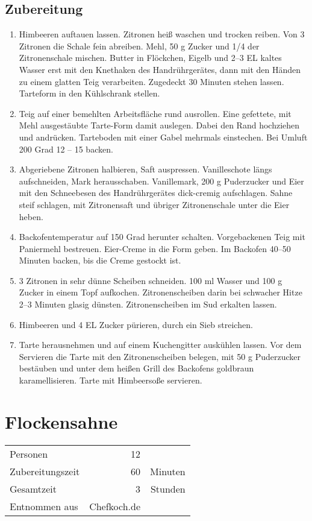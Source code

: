 \subsection*{Zubereitung}
\begin{enumerate}
	\item Himbeeren auftauen lassen. Zitronen heiß waschen und trocken reiben. Von 3 Zitronen die Schale fein abreiben. Mehl, 50 g Zucker und 1/4 der Zitronenschale mischen. Butter in Flöckchen, Eigelb und 2–3 EL kaltes Wasser erst mit den Knethaken des Handrührgerätes, dann mit den Händen zu einem glatten Teig verarbeiten. Zugedeckt 30 Minuten stehen lassen. Tarteform in den Kühlschrank stellen.
	\item Teig auf einer bemehlten Arbeitsfläche rund ausrollen. Eine gefettete, mit Mehl ausgestäubte Tarte-Form damit auslegen. Dabei den Rand hochziehen und andrücken. Tarteboden mit einer Gabel mehrmals einstechen. Bei Umluft 200 Grad 12 -- 15 backen. 
	\item Abgeriebene Zitronen halbieren, Saft auspressen. Vanilleschote längs aufschneiden, Mark herausschaben. Vanillemark, 200 g Puderzucker und Eier mit den Schneebesen des Handrührgerätes dick-cremig aufschlagen. Sahne steif schlagen, mit Zitronensaft und übriger Zitronenschale unter die Eier heben.
	\item Backofentemperatur auf 150 Grad herunter schalten. Vorgebackenen Teig mit Paniermehl bestreuen. Eier-Creme in die Form geben. Im  Backofen 40–50 Minuten backen, bis die Creme gestockt ist. 
	\item 3 Zitronen in sehr dünne Scheiben schneiden. 100 ml Wasser und 100 g Zucker in einem Topf aufkochen. Zitronenscheiben darin bei schwacher Hitze 2–3 Minuten glasig dünsten. Zitronenscheiben im Sud erkalten lassen.
	\item Himbeeren und 4 EL Zucker pürieren, durch ein Sieb streichen.
	\item  Tarte herausnehmen und auf einem Kuchengitter auskühlen lassen. Vor dem Servieren die Tarte mit den Zitronenscheiben belegen, mit 50 g Puderzucker bestäuben und unter dem heißen Grill des Backofens goldbraun karamellisieren. Tarte mit Himbeersoße servieren.
\end{enumerate}


\section{Flockensahne} 

\begin{tabular}{lrr}
	Personen         &                12 &  \\
	Zubereitungszeit &               60 & Minuten \\
	Gesamtzeit       &                3   & Stunden \\
	Entnommen aus    & Chefkoch.de &
\end{tabular} 

